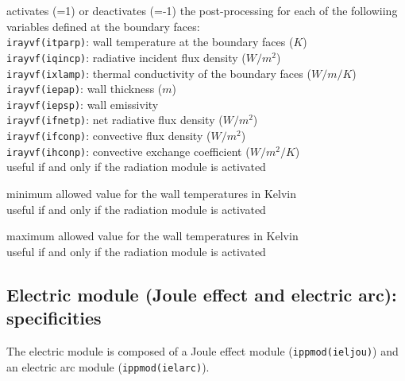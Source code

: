 {activates (=1) or deactivates (=-1) the post-processing for each of the
followiing variables defined at the boundary faces:\\
\hspace*{1.3cm} {\tt irayvf(itparp)}: wall temperature at the boundary
faces ($K$)\\
\hspace*{1.3cm} {\tt irayvf(iqincp)}: radiative incident flux density
($W/m^2$)\\
\hspace*{1.3cm} {\tt irayvf(ixlamp)}: thermal conductivity of the
boundary faces ($W/m/K$)\\
\hspace*{1.3cm} {\tt irayvf(iepap)}: wall thickness ($m$)\\
\hspace*{1.3cm} {\tt irayvf(iepsp)}: wall emissivity \\
\hspace*{1.3cm} {\tt irayvf(ifnetp)}: net radiative flux density ($W/m^2$)\\
\hspace*{1.3cm} {\tt irayvf(ifconp)}: convective flux density ($W/m^2$)\\
\hspace*{1.3cm} {\tt irayvf(ihconp)}: convective exchange coefficient
($W/m^2/K$)\\
useful if and only if the radiation module is activated}

{minimum allowed value for the wall temperatures in Kelvin\\
useful if and only if the radiation module is activated}

{maximum allowed value for the wall temperatures in Kelvin\\
useful if and only if the radiation module is activated}

\subsection{Electric module (Joule effect and electric arc): specificities}

The electric module is composed of a Joule effect module
(\texttt{ippmod(ieljou)}) and an electric arc module
(\texttt{ippmod(ielarc)}).

